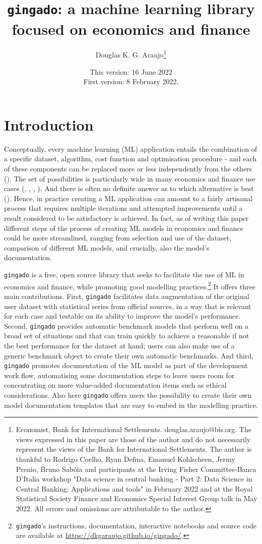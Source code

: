 \documentclass{article}
\title{\texttt{gingado}: a machine learning library focused on economics and finance}
\author{Douglas K. G. Araujo\footnote{Economist, Bank for International Settlements. douglas.araujo@bis.org. The views expressed in this paper are those of the author and do not necessarily represent the views of the Bank for International Settlements. The author is thankful to Rodrigo Coelho, Ryan Defina, Emanuel Kohlscheen, Jermy Prenio, Bruno Sabóia and participants at the Irving Fisher Committee-Banca D'Italia workshop "Data science in central banking - Part 2: Data Science in Central Banking: Applications and tools" in February 2022 and at the Royal Statistical Society Finance and Economics Special Interest Group talk in May 2022. All errors and omissions are attributable to the author.}}
\date{This version: 16 June 2022\\First version: 8 February 2022.}
\begin{document}
\maketitle

\section{Introduction}



Conceptually, every machine learning (ML) application entails the combination of a specific dataset, algorithm, cost function and optimisation procedure - and each of these components can be replaced more or less independently from the others (\cite{DeepLearning}). The set of possibilities is particularly wide in many economics and finance use cases (\cite{doi:10.1146/annurev-economics-080217-053433}, \cite{10.1257/jep.31.2.87}, \cite{varian2014big}, \cite{doerr2021big} \cite{chakraborty2017machine}). And there is often no definite answer as to which alternative is best (\cite{10.1257/jep.31.2.87}). Hence, in practice creating a ML application can amount to a fairly artisanal process that requires multiple iterations and attempted improvements until a result considered to be satisfactory is achieved. In fact, as of writing this paper different steps of the process of creating ML models in economics and finance could be more streamlined, ranging from selection and use of the dataset, comparison of different ML models, and crucially, also the model's documentation. 

\texttt{gingado} is a free, open source library that seeks to facilitate the use of ML in economics and finance, while promoting good modelling practices.\footnote{\texttt{gingado}'s instructions, documentation, interactive notebooks and source code are available at \url{https://dkgaraujo.github.io/gingado/}.} It offers three main contributions. First, \texttt{gingado} facilitates data augmentation of the original user dataset with statistical series from official sources, in a way that is relevant for each case and testable on its ability to improve the model's performance. Second, \texttt{gingado} provides automatic benchmark models that perform well on a broad set of situations and that can train quickly to achieve a reasonable if not the best performance for the dataset at hand; users can also make use of a generic benchmark object to create their own automatic benchmarks. And third, \texttt{gingado} promotes documentation of the ML model as part of the development work flow, automatising some documentation steps to leave users room for concentrating on more value-added documentation items such as ethical considerations. Also here \texttt{gingado} offers users the possibility to create their own model documentation templates that are easy to embed in the modelling practice.
\end{document}
